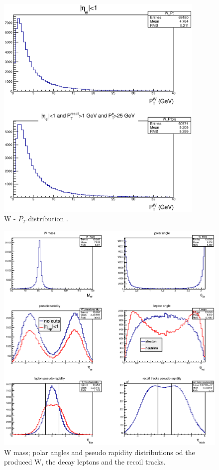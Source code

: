 \documentclass[12pt]{article}
\begin{document}
\begin{figure}[tbhp]
\begin{center}
\includegraphics[width=10cm]{images/W_Pt.eps}
\end{center}
\caption{\label{fig:MC_W_Pt} W - $P_T$ distribution .}
\end{figure}

\begin{figure}[tbhp]
\begin{center}
\includegraphics[width=14cm]{images/W_rapidity.eps}
\end{center}
\caption{\label{fig:MC_W_eta} W mass; polar angles and pseudo rapidity distributions od the produced W, the decay leptons and the recoil tracks.}
\end{figure}
\end{document}
